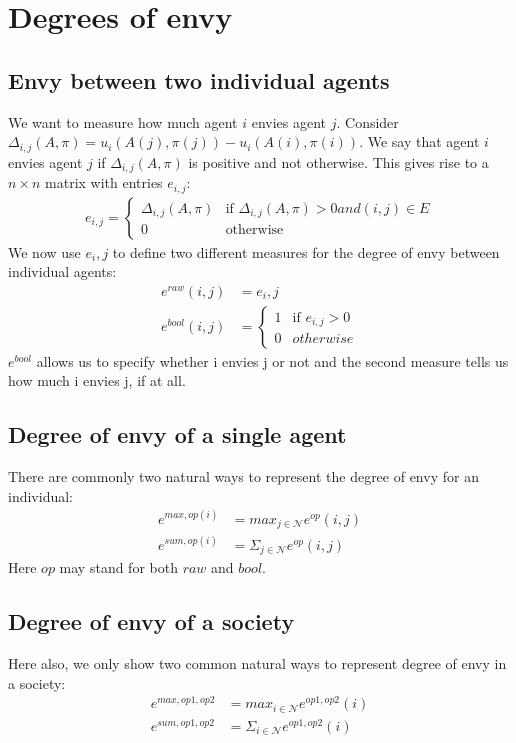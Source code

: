 \documentclass{article}
\begin{document}
\section{Degrees of envy}
\subsection{Envy between two individual agents}
We want to measure how much agent $i$ envies agent $j$. Consider $\Delta_{i,j}(A,\pi) = u_i(A(j),\pi(j)) - u_i(A(i),\pi(i))$. We say that agent $i$ envies agent $j$ if $\Delta_{i,j}(A,\pi)$ is positive and not otherwise. This gives rise to a $n\times n$ matrix with entries $e_{i,j}:$
\begin{align*}
    e_{i,j} = \begin{cases}
             \Delta_{i,j}(A, \pi)  & \text{if } \Delta_{i,j}(A, \pi) > 0 and (i,j) \in E \\
             0  & \text{otherwise}
       \end{cases}
\end{align*}
We now use $e_i,j$ to define two different measures for the degree of envy between individual agents:
\begin{align*}
    e^{raw}(i,j) &= e_i,j     \\
    e^{bool}(i,j) &= \begin{cases}
                    1 &\text{if } e_{i,j} > 0 \\
                    0 & otherwise
                    \end{cases}
\end{align*}
$e^{bool}$ allows us to specify whether i envies j or not and the second measure tells us how much i envies j, if at all.
\subsection{Degree of envy of a single agent}
There are commonly two natural ways to represent the degree of envy for an individual:
\begin{align*}
    e^{max,op(i)} &= max_{j\in \mathcal{N}} e^{op}(i,j) \\
    e^{sum,op(i)} &= \Sigma_{j\in \mathcal{N}} e^{op}(i,j)
\end{align*}
Here $op$ may stand for both $raw$ and $bool$.
\subsection{Degree of envy of a society}
Here also, we only show two common natural ways to represent degree of envy in a society:
\begin{align*}
    e^{max,op1,op2} &= max_{i\in \mathcal{N}} e^{op1,op2}(i) \\
    e^{sum,op1,op2} &= \Sigma_{i\in \mathcal{N}} e^{op1,op2}(i)
\end{align*}
\end{document}
